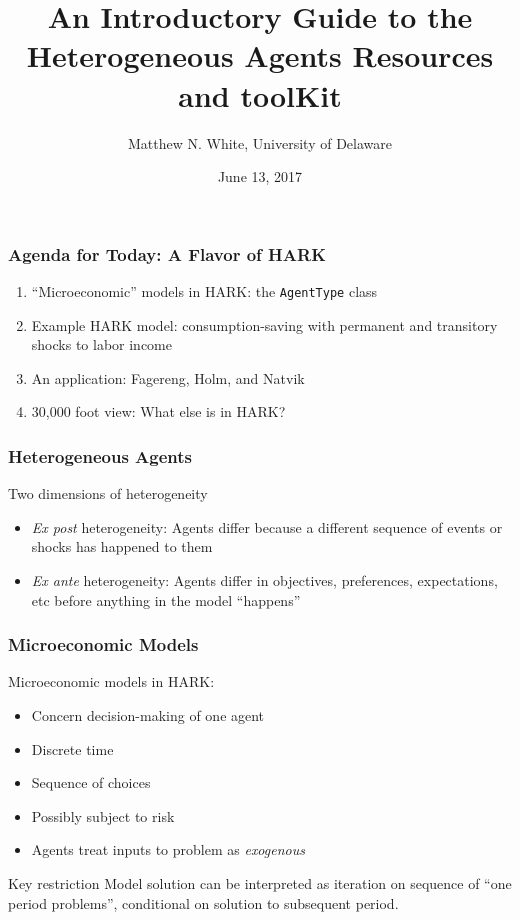 \documentclass[11ptt]{beamer}
\author{Matthew N. White, University of Delaware}
\title{An Introductory Guide to the \\ Heterogeneous Agents Resources and toolKit}
\date{June 13, 2017}
\newcommand{\bi}{\begin{itemize}}
\newcommand{\ei}{\end{itemize}}
\begin{document}
\begin{frame}
\maketitle
\end{frame}


\begin{frame}
\frametitle{Agenda for Today: A Flavor of HARK}
\begin{enumerate}
\item ``Microeconomic'' models in HARK: the \texttt{AgentType} class

\item Example HARK model: consumption-saving with permanent and transitory shocks to labor income

\item An application: Fagereng, Holm, and Natvik

\item 30,000 foot view: What else is in HARK?
\end{enumerate}
\end{frame}


\begin{frame}
\frametitle{Heterogeneous Agents}
\begin{block}{Two dimensions of heterogeneity}
\bi
\item \textit{Ex post} heterogeneity: Agents differ because a different sequence of events or shocks has happened to them

\item \textit{Ex ante} heterogeneity: Agents differ in objectives, preferences, expectations, etc before anything in the model ``happens''
\ei
\end{block}

\end{frame}


\begin{frame}
\frametitle{Microeconomic Models}
\begin{block}{Microeconomic models in HARK:}
\bi
\item Concern decision-making of one agent

\item Discrete time

\item Sequence of choices

\item Possibly subject to risk

\item Agents treat inputs to problem as \textit{exogenous}
\ei
\end{block}

\begin{block}{Key restriction}
Model solution can be interpreted as iteration on sequence of ``one period problems'', conditional on solution to subsequent period.
\end{block}
\end{frame}
\end{document}
